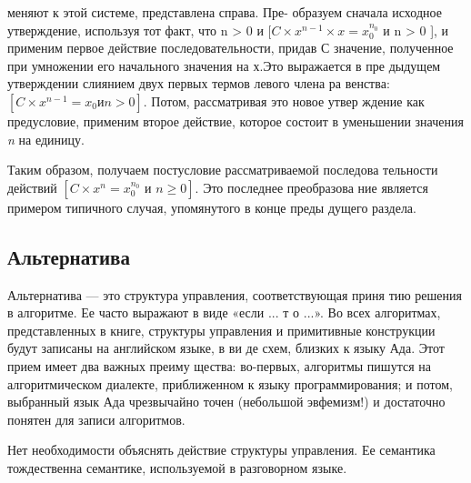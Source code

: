 \noindent меняют к этой системе, представлена справа. Пре­-\linebreak
образуем сначала исходное утверждение, используя тот 
факт, что 
\noindent n > 0 и \textit{$[C\times x^{n-1} \times x = x_{0}^{n_{0}}$} и n > 0 ], и применим
первое  действие  последовательности, придав С значение, полученное 
при умножении его начального значения на х.Это выражается в пре­
дыдущем утверждении слиянием двух первых термов левого члена ра­
венства:\textit{$[C\times x^{n-1} = x_{0} и n > 0]$}. Потом, рассматривая это новое утвер­
ждение как  предусловие,  применим  второе действие, которое состоит 
в уменьшении значения \textit{n} на единицу.

\parindent=1cm Таким образом, получаем постусловие  рассматриваемой последова­
тельности действий \textit{$[C\times x^{n} = x_{0}^{n_{0}} \textit{ и } n \geqslant 0]$}. Это последнее преобразова­
ние является примером типичного случая, упомянутого в конце преды­
дущего раздела.

\subsection{Альтернатива}
\noindent Альтернатива — это структура управления,  соответствующая  приня­
тию решения в алгоритме. Ее часто выражают в виде «если ...  т о  ...». 
Во всех алгоритмах, представленных в книге, структуры управления и 
примитивные конструкции будут записаны на английском языке, в ви­
де схем, близких к языку Ада.  Этот прием имеет два важных преиму­
щества: во-первых, алгоритмы пишутся на алгоритмическом диалекте, 
приближенном к языку  программирования; и потом,  выбранный язык 
Ада чрезвычайно точен  (небольшой эвфемизм!)  и достаточно понятен 
для записи алгоритмов.

\parindent=1cm Нет необходимости объяснять действие структуры  управления.  Ее 
семантика тождественна семантике, используемой в разговорном языке.
\newline
\pagebreak

